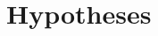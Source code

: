 \documentclass[review,fleqn]{elsarticle}\usepackage[]{graphicx}\usepackage[]{color}
\begin{document}












\section{Hypotheses}\label{sec:hyp}


\end{document}
